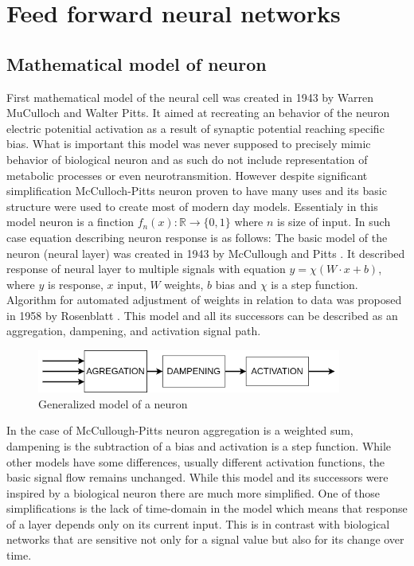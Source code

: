 \section{Feed forward neural networks}

\subsection{Mathematical model of neuron}
First mathematical model of the neural cell was created in 1943 by Warren MuCulloch and Walter Pitts.
It aimed at recreating an behavior of the neuron electric potenitial activation as a result of
synaptic potential reaching specific bias. What is important this model was never supposed to
precisely mimic behavior of biological neuron and as such do not include representation of metabolic
processes or even neurotransmition.
However despite significant simplification McCulloch-Pitts neuron proven to have many uses and
its basic structure were used to create most of modern day models.
Essentialy in this model neuron is a finction $f_n(x):\mathbb{R} \rightarrow \{ 0,1 \} $ where $n$
is size of input.
In such case equation describing neuron response is as follows:
The basic model of the neuron (neural layer) was created in 1943 by McCullough and Pitts 
\cite{McCulloch1943}. It described response of neural layer to multiple signals with
equation $y= \chi (W\cdot x+b)$, where $y$ is response, $x$ input, $W$ weights, $b$ bias and
$\chi$ is a step function.
Algorithm for automated adjustment of weights in relation to data was proposed in 1958
by Rosenblatt \cite{Rosenblatt58}. This model and all its successors can be described
as an aggregation, dampening, and activation signal path.
\begin{figure}[ht] 
	\centering
	\includegraphics[width=10cm]{res/basic_neuron}
	\caption{Generalized model of a neuron}
	\label{fig:basic_neuron}
\end{figure}
In the case of McCullough-Pitts neuron aggregation is a weighted sum, dampening is the subtraction
of a bias and activation is a step function. While other models have some differences,
usually different activation functions, the basic signal flow remains unchanged.
While this model and its successors were inspired by a biological neuron there are much
more simplified. One of those simplifications is the lack of time-domain in the model which means
that response of a layer depends only on its current input.
This is in contrast with biological networks that are sensitive not only for a signal value
but also for its change over time.

